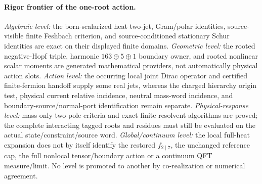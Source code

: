 \documentclass[12pt,a4paper]{article}
\begin{document}
\paragraph{Rigor frontier of the one-root action.}
\label{p3a:par:v245-common-action-rigor-frontier}
\emph{Algebraic level:} the born-scalarized heat two-jet, Gram/polar
identities, source-visible finite Feshbach criterion, and source-conditioned
stationary Schur identities are exact on their displayed finite domains.
\emph{Geometric level:} the rooted negative-Hopf triple, harmonic
$163\oplus5\oplus1$ boundary owner, and rooted nonlinear scalar moments are
generated mathematical providers, not automatically physical action slots.
\emph{Action level:} the occurring local joint Dirac operator and certified
finite-fermion handoff supply some real jets, whereas the charged hierarchy
origin test, physical current relative incidence, neutral mass-word
incidence, and boundary-source/normal-port identification remain separate.
\emph{Physical-response level:} mass-only two-pole criteria and exact finite
resolvent algorithms are proved; the complete interacting tagged roots and
residues must still be evaluated on the actual state/constraint/source word.
\emph{Global/continuum level:} the local full-heat expansion does not by
itself identify the restored $f_{2\mid7}$, the unchanged reference cap, the
full nonlocal tensor/boundary action or a continuum QFT measure/limit.
No level is promoted to another by co-realization or numerical agreement.
\end{document}
